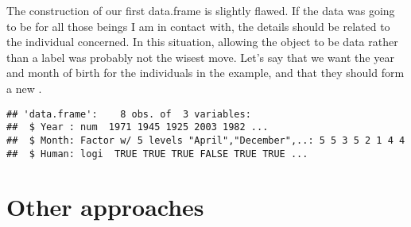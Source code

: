 The construction of our first data.frame is slightly flawed. If the  data was going to be for all those beings I am in contact with, the details should be related to the individual concerned. In this situation, allowing the  object to be data rather than a label was probably not the wisest move. Let's say that we want the year and month of birth for the individuals in the example, and that they should form a new . 
\begin{knitrout}
\color{fgcolor}\begin{kframe}
\begin{alltt}
 \hlkwb{=} \hlstd{(}\hlstd{,} \hlstd{,} \hlstd{,} \hlstd{,} \hlstd{,} \hlstd{,} \hlstd{,} \hlstd{)}
 \hlkwb{=} \hlstd{(}\hlstd{,} \hlstd{,} \hlstd{,} \hlstd{,} \hlstd{,} \hlstd{,} \hlstd{,} \hlstd{)}
 \hlkwb{=}   
\end{alltt}
\begin{verbatim}
## 'data.frame':	8 obs. of  3 variables:
##  $ Year : num  1971 1945 1925 2003 1982 ...
##  $ Month: Factor w/ 5 levels "April","December",..: 5 5 3 5 2 1 4 4
##  $ Human: logi  TRUE TRUE TRUE FALSE TRUE TRUE ...
\end{verbatim}
\end{kframe}
\end{knitrout}
 
\section{Other approaches} 
 
